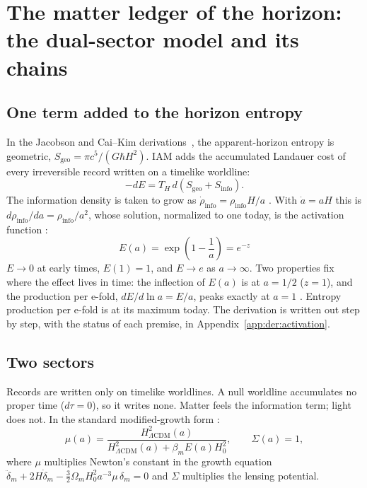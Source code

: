 \chapter{The matter ledger of the horizon: the dual-sector model and its chains}\label{ch:dual}

\section{One term added to the horizon entropy}

In the Jacobson and Cai--Kim derivations~\cite{Jacobson1995,CaiKim2005}, the apparent-horizon entropy is geometric, $S_{\mathrm{geo}}=\pi c^5/(G\hbar H^2)$.
IAM adds the accumulated Landauer cost of every irreversible record written on a timelike worldline:
\begin{equation}
 -dE=T_H\,d\!\left(S_{\mathrm{geo}}+S_{\mathrm{info}}\right).
\end{equation}
The information density is taken to grow as $\dot\rho_{\mathrm{info}}=\rho_{\mathrm{info}}H/a$ \conjecture. With $\dot a=aH$ this is
$d\rho_{\mathrm{info}}/da=\rho_{\mathrm{info}}/a^2$, whose solution, normalized to one today, is the activation function \derived:
\begin{equation}
 \boxed{\;E(a)=\exp\!\left(1-\frac1a\right)=e^{-z}\;}
 \label{part2:eq:Ea_chains}
\end{equation}
$E\to0$ at early times, $E(1)=1$, and $E\to e$ as $a\to\infty$. Two properties fix where the effect lives in time:
the inflection of $E(a)$ is at $a=1/2$ ($z=1$), and the production per e-fold, $dE/d\ln a=E/a$, peaks exactly at $a=1$ \calc.
Entropy production per e-fold is at its maximum today.
The derivation is written out step by step, with the status of each premise, in Appendix~\ref{app:der:activation}.

\section{Two sectors}

Records are written only on timelike worldlines. A null worldline accumulates no proper time ($d\tau=0$), so it writes none.
Matter feels the information term; light does not. In the standard modified-growth form \derived:
\begin{equation}
 \mu(a)=\frac{H^2_{\Lambda\mathrm{CDM}}(a)}{H^2_{\Lambda\mathrm{CDM}}(a)+\beta_m E(a)H_0^2},\qquad \Sigma(a)=1,
 \label{part2:eq:mu}
\end{equation}
where $\mu$ multiplies Newton's constant in the growth equation
$\ddot\delta_m+2H\dot\delta_m-\tfrac32\Omega_mH_0^2a^{-3}\mu\,\delta_m=0$ and $\Sigma$ multiplies the lensing potential.


